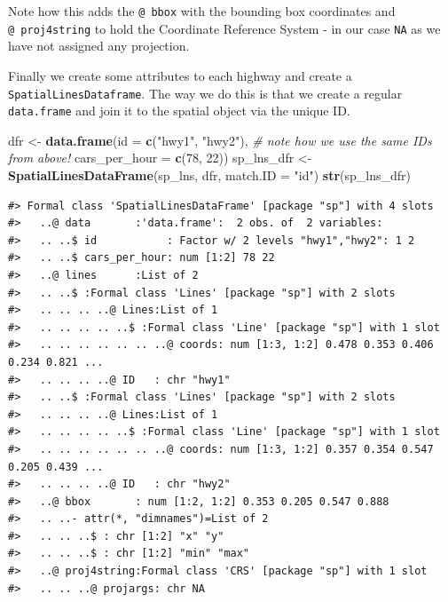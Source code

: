 \documentclass[]{book}
\newenvironment{Shaded}{\begin{snugshade}}{\end{snugshade}}
\newcommand{\KeywordTok}[1]{\textcolor[rgb]{0.13,0.29,0.53}{\textbf{#1}}}
\newcommand{\DataTypeTok}[1]{\textcolor[rgb]{0.13,0.29,0.53}{#1}}
\newcommand{\DecValTok}[1]{\textcolor[rgb]{0.00,0.00,0.81}{#1}}
\newcommand{\StringTok}[1]{\textcolor[rgb]{0.31,0.60,0.02}{#1}}
\newcommand{\CommentTok}[1]{\textcolor[rgb]{0.56,0.35,0.01}{\textit{#1}}}
\newcommand{\NormalTok}[1]{#1}
\begin{document}
Note how this adds the \texttt{@\ bbox} with the bounding box
coordinates and \texttt{@\ proj4string} to hold the Coordinate Reference
System - in our case \texttt{NA} as we have not assigned any projection.

Finally we create some attributes to each highway and create a
\texttt{SpatialLinesDataframe}. The way we do this is that we create a
regular \texttt{data.frame} and join it to the spatial object via the
unique ID.

\begin{Shaded}
\begin{Highlighting}[]
\NormalTok{dfr <-}\StringTok{ }\KeywordTok{data.frame}\NormalTok{(}\DataTypeTok{id =} \KeywordTok{c}\NormalTok{(}\StringTok{"hwy1"}\NormalTok{, }\StringTok{"hwy2"}\NormalTok{), }\CommentTok{# note how we use the same IDs from above!}
                  \DataTypeTok{cars_per_hour =} \KeywordTok{c}\NormalTok{(}\DecValTok{78}\NormalTok{, }\DecValTok{22}\NormalTok{)) }
\NormalTok{sp_lns_dfr <-}\StringTok{ }\KeywordTok{SpatialLinesDataFrame}\NormalTok{(sp_lns, dfr, }\DataTypeTok{match.ID =} \StringTok{"id"}\NormalTok{)}
\KeywordTok{str}\NormalTok{(sp_lns_dfr)}
\end{Highlighting}
\end{Shaded}

\begin{verbatim}
#> Formal class 'SpatialLinesDataFrame' [package "sp"] with 4 slots
#>   ..@ data       :'data.frame':  2 obs. of  2 variables:
#>   .. ..$ id           : Factor w/ 2 levels "hwy1","hwy2": 1 2
#>   .. ..$ cars_per_hour: num [1:2] 78 22
#>   ..@ lines      :List of 2
#>   .. ..$ :Formal class 'Lines' [package "sp"] with 2 slots
#>   .. .. .. ..@ Lines:List of 1
#>   .. .. .. .. ..$ :Formal class 'Line' [package "sp"] with 1 slot
#>   .. .. .. .. .. .. ..@ coords: num [1:3, 1:2] 0.478 0.353 0.406 0.234 0.821 ...
#>   .. .. .. ..@ ID   : chr "hwy1"
#>   .. ..$ :Formal class 'Lines' [package "sp"] with 2 slots
#>   .. .. .. ..@ Lines:List of 1
#>   .. .. .. .. ..$ :Formal class 'Line' [package "sp"] with 1 slot
#>   .. .. .. .. .. .. ..@ coords: num [1:3, 1:2] 0.357 0.354 0.547 0.205 0.439 ...
#>   .. .. .. ..@ ID   : chr "hwy2"
#>   ..@ bbox       : num [1:2, 1:2] 0.353 0.205 0.547 0.888
#>   .. ..- attr(*, "dimnames")=List of 2
#>   .. .. ..$ : chr [1:2] "x" "y"
#>   .. .. ..$ : chr [1:2] "min" "max"
#>   ..@ proj4string:Formal class 'CRS' [package "sp"] with 1 slot
#>   .. .. ..@ projargs: chr NA
\end{verbatim}
\end{document}
